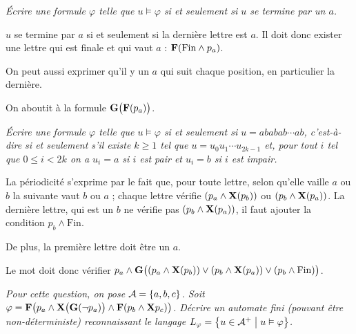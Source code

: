 \begin{Exercise}\it
Écrire une formule $\varphi$ telle que $u\vDash \varphi$ si et seulement si $u$ se termine par un $a$.
\end{Exercise}
\begin{Answer}
$u$ se termine par $a$ si et seulement si la dernière lettre est $a$. Il doit donc exister une lettre qui est finale et qui vaut $a$ : ${\bf F}(\text{Fin} \wedge p_a)$.

On peut aussi exprimer qu'il y un $a$ qui suit chaque position, en particulier la dernière. 

On aboutit à la formule ${\bf G}\bigl({\bf F}(p_a)\bigr)$.
\end{Answer}
\begin{Exercise}\it
Écrire une formule $\varphi$ telle que $u\vDash\varphi$ si et seulement si $u=ababab\cdots ab$, c'est-à-dire si et seulement s'il existe $k \ge 1$ tel que $u=u_0u_1\cdots u_{2k-1}$ et, pour tout $i$ tel que $0\le i < 2k$ on a $u_i =a$ si $i$ est pair et $u_i =b$ si $i$ est impair.
\end{Exercise}
\begin{Answer}
La périodicité s'exprime par le fait que, pour toute lettre, selon qu'elle vaille $a$ ou $b$ la suivante vaut $b$ ou $a$ ; chaque lettre vérifie $(p_a \wedge {\bf X}(p_b))$ ou $(p_b \wedge {\bf X}(p_a))$. La dernière lettre, qui est un $b$ ne vérifie pas $(p_b \wedge {\bf X}(p_a))$, il faut ajouter la condition $p_b \wedge \text{Fin}$.

De plus, la première lettre doit être un $a$. 

Le mot doit donc vérifier $p_a\wedge {\bf G}\bigl((p_a \wedge {\bf X}(p_b)) \vee (p_b \wedge {\bf X}(p_a)) \vee (p_b \wedge \text{Fin})\bigr)$.

\end{Answer}
\begin{Exercise}[title = {Pour les cubes seulement}]\it
Pour cette question, on pose ${\cal A}=\{a, b, c\}$. Soit $\varphi={\bf F}\bigl(p_a \wedge {\bf X}\bigl({\bf G}(\neg p_a)\bigr)\wedge {\bf F}(p_b \wedge {\bf X} p_c)\bigr)$. Décrire un automate fini (pouvant être non-déterministe) reconnaissant le langage $L_\varphi=\bigl\{u\in {\cal A}^+\bigm|u\vDash \varphi\bigr\}$.
\end{Exercise}
